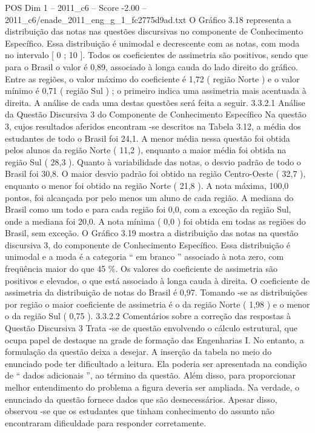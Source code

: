 \begin{textsample}{POS Dim 1 – 2011\_c6 – Score -2.00 – 2011\_c6/enade\_2011\_eng\_g\_1\_fc2775d9ad.txt}
O Gráfico 3.18 representa a distribuição das notas nas questões discursivas no componente de Conhecimento Específico.
Essa distribuição é unimodal e decrescente com as notas, com moda no intervalo [ 0 ; 10 ].
Todos os coeficientes de assimetria são positivos, sendo que para o Brasil o valor é 0,89, associado à longa cauda do lado direito do gráfico.
Entre as regiões, o valor máximo do coeficiente é 1,72 ( região Norte ) e o valor mínimo é 0,71 ( região Sul ) ; o primeiro indica uma assimetria mais acentuada à direita.
A análise de cada uma destas questões será feita a seguir. 3.3.2.1 Análise da Questão Discursiva 3 do Componente de Conhecimento Específico Na questão 3, cujos resultados aferidos encontram -se descritos na Tabela 3.12, a média dos estudantes de todo o Brasil foi 24,1.
A menor média nessa questão foi obtida pelos alunos da região Norte ( 11,2 ), enquanto a maior média foi obtida na região Sul ( 28,3 ).
Quanto à variabilidade das notas, o desvio padrão de todo o Brasil foi 30,8.
O maior desvio padrão foi obtido na região Centro-Oeste ( 32,7 ), enquanto o menor foi obtido na região Norte ( 21,8 ).
A nota máxima, 100,0 pontos, foi alcançada por pelo menos um aluno de cada região.
A mediana do Brasil como um todo e para cada região foi 0,0, com a exceção da região Sul, onde a mediana foi 20,0.
A nota mínima ( 0,0 ) foi obtida em todas as regiões do Brasil, sem exceção.
O Gráfico 3.19 mostra a distribuição das notas na questão discursiva 3, do componente de Conhecimento Específico.
Essa distribuição é unimodal e a moda é a categoria “ em branco ” associado à nota zero, com freqüência maior do que 45 \%.
Os valores do coeficiente de assimetria são positivos e elevados, o que está associado à longa cauda à direita.
O coeficiente de assimetria da distribuição de notas do Brasil é 0,97.
Tomando -se as distribuições por região o maior coeficiente de assimetria é o da região Norte ( 1,98 ) e o menor o da região Sul ( 0,75 ). 3.3.2.2 Comentários sobre a correção das respostas à Questão Discursiva 3 Trata -se de questão envolvendo o cálculo estrutural, que ocupa papel de destaque na grade de formação das Engenharias I.
No entanto, a formulação da questão deixa a desejar.
A inserção da tabela no meio do enunciado pode ter dificultado a leitura.
Ela poderia ser apresentada na condição de “ dados adicionais ”, ao término da questão.
Além disso, para proporcionar melhor entendimento do problema a figura deveria ser ampliada.
Na verdade, o enunciado da questão fornece dados que são desnecessários.
Apesar disso, observou -se que os estudantes que tinham conhecimento do assunto não encontraram dificuldade para responder corretamente.

\end{textsample}
